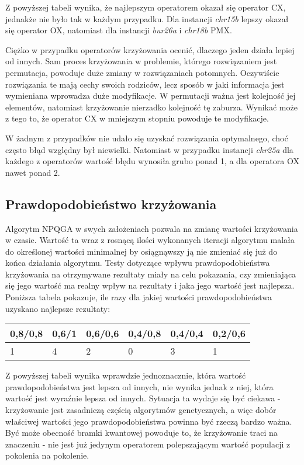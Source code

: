 Z powyższej tabeli wynika, że najlepszym operatorem okazał się operator CX, jednakże nie było tak w każdym przypadku. Dla instancji \textit{chr15b} lepszy okazał się operator OX, natomiast dla instancji \textit{bur26a} i \textit{chr18b} PMX.

Ciężko w przypadku operatorów krzyżowania ocenić, dlaczego jeden działa lepiej od innych. Sam proces krzyżowania w problemie, którego rozwiązaniem jest permutacja, powoduje duże zmiany w rozwiązaniach potomnych. Oczywiście rozwiązania te mają cechy swoich rodziców, lecz sposób w jaki informacja jest wymieniana wprowadza duże modyfikacje. W permutacji ważna jest kolejność jej elementów, natomiast krzyżowanie nierzadko kolejność tę zaburza. Wynikać może z tego to, że operator CX w mniejszym stopniu powoduje te modyfikacje.

W żadnym z przypadków nie udało się uzyskać rozwiązania optymalnego, choć często błąd względny był niewielki. Natomiast w przypadku instancji \textit{chr25a} dla każdego z operatorów wartość błędu wynosiła grubo ponad 1, a dla operatora OX nawet ponad 2.

\subsection{Prawdopodobieństwo krzyżowania}
Algorytm NPQGA w swych założeniach pozwala na zmianę wartości krzyżowania w czasie. Wartość ta wraz z rosnącą ilości wykonanych iteracji algorytmu malała do określonej wartości minimalnej by osiągnąwszy ją nie zmieniać się już do końca działania algorytmu. Testy dotyczące wpływu prawdopodobieństwa krzyżowania na otrzymywane rezultaty miały na celu pokazania, czy zmieniająca się jego wartość ma realny wpływ na rezultaty i jaka jego wartość jest najlepsza. Poniższa tabela pokazuje, ile razy dla jakiej wartości prawdopodobieństwa uzyskano najlepsze rezultaty:

\begin{center}
\begin{table}[H]
\label{cross_prob_results}
\begin{tabular}{l l l l l l}
\hline
0,8/0,8 & 0,6/1 & 0,6/0,6 & 0,4/0,8 & 0,4/0,4 & 0,2/0,6\\
\hline
1 & 4 & 2 & 0 & 3 & 1\\
\hline
\end{tabular}
\end{table}
\end{center}

Z powyższej tabeli wynika wprawdzie jednoznacznie, która wartość prawdopodobieństwa jest lepsza od innych, nie wynika jednak z niej, która wartość jest wyraźnie lepsza od innych. Sytuacja ta wydaje się być ciekawa - krzyżowanie jest zasadniczą częścią algorytmów genetycznych, a więc dobór właściwej wartości jego prawdopodobieństwa powinna być rzeczą bardzo ważna. Być może obecność bramki kwantowej powoduje to, że krzyżowanie traci na znaczeniu - nie jest już jedynym operatorem polepszającym wartość populacji z pokolenia na pokolenie.

